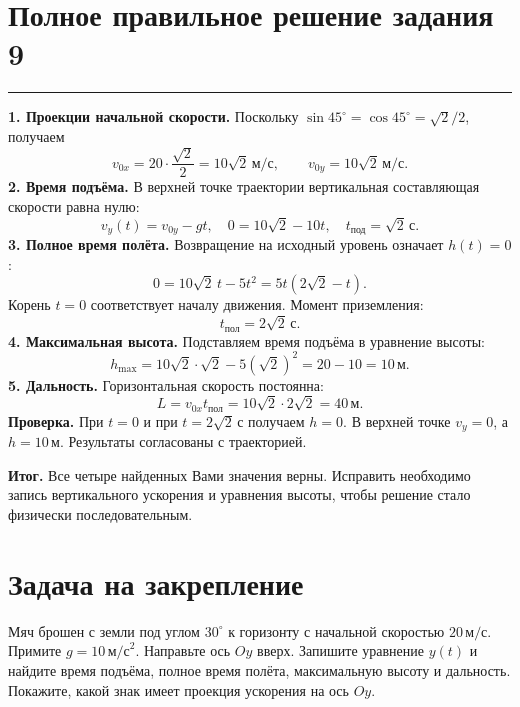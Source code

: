 \documentclass[a4paper,12pt]{article}
\newcommand{\sectionline}{\par\vspace{2mm}\noindent\color{accent}\rule{\linewidth}{0.65pt}\color{black}\par\vspace{1mm}}
\newcommand{\lbl}[1]{\textbf{\color{darkaccent}#1}}
\begin{document}
\section*{Полное правильное решение задания 9}
\sectionline
\lbl{1. Проекции начальной скорости.} Поскольку $\sin45^\circ=\cos45^\circ=\sqrt2/2$, получаем
\[
 v_{0x}=20\cdot\frac{\sqrt2}{2}=10\sqrt2\,\text{м/с},
 \qquad v_{0y}=10\sqrt2\,\text{м/с}.
\]
\lbl{2. Время подъёма.} В верхней точке траектории вертикальная составляющая скорости равна нулю:
\[
 v_y(t)=v_{0y}-gt,\quad
 0=10\sqrt2-10t,\quad
 \boxed{t_{\text{под}}=\sqrt2\,\text{с}}.
\]
\lbl{3. Полное время полёта.} Возвращение на исходный уровень означает $h(t)=0$:
\[
 0=10\sqrt2\,t-5t^2
   =5t(2\sqrt2-t).
\]
Корень $t=0$ соответствует началу движения. Момент приземления:
\[
 \boxed{t_{\text{пол}}=2\sqrt2\,\text{с}}.
\]
\lbl{4. Максимальная высота.} Подставляем время подъёма в уравнение высоты:
\[
 h_{\max}=10\sqrt2\cdot\sqrt2-5(\sqrt2)^2
 =20-10=\boxed{10\,\text{м}}.
\]
\lbl{5. Дальность.} Горизонтальная скорость постоянна:
\[
 L=v_{0x}t_{\text{пол}}
 =10\sqrt2\cdot2\sqrt2
 =\boxed{40\,\text{м}}.
\]
\lbl{Проверка.} При $t=0$ и при $t=2\sqrt2\,\text{с}$ получаем $h=0$. В верхней точке $v_y=0$, а $h=10\,\text{м}$. Результаты согласованы с траекторией.

\textcolor{darkaccent}{\textbf{Итог.}} Все четыре найденных Вами значения верны. Исправить необходимо запись вертикального ускорения и уравнения высоты, чтобы решение стало физически последовательным.

\vspace{2mm}
\section*{Задача на закрепление}
Мяч брошен с земли под углом $30^\circ$ к горизонту с начальной скоростью $20\,\text{м/с}$. Примите $g=10\,\text{м/с}^2$. Направьте ось $Oy$ вверх. Запишите уравнение $y(t)$ и найдите время подъёма, полное время полёта, максимальную высоту и дальность. Покажите, какой знак имеет проекция ускорения на ось $Oy$.
\end{document}
